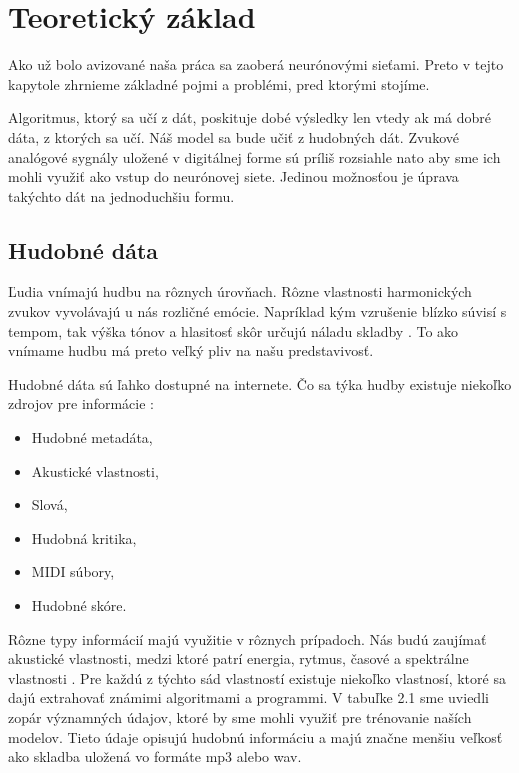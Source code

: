 \chapter{Teoretický základ}
\label{teoreticky_zaklad}

Ako už bolo avizované naša práca sa zaoberá neurónovými sieťami. Preto v tejto kapytole zhrnieme základné pojmi a problémi, pred ktorými stojíme.

Algoritmus, ktorý sa učí z dát, poskituje dobé výsledky len vtedy ak má dobré dáta, z ktorých sa učí. 
Náš model sa bude učiť z hudobných dát.
Zvukové analógové sygnály uložené v digitálnej forme sú príliš rozsiahle nato aby sme ich mohli využiť ako vstup do neurónovej siete.
Jedinou možnosťou je úprava takýchto dát na jednoduchšiu formu.

\section{Hudobné dáta}
Ľudia vnímajú hudbu na rôznych úrovňach.
Rôzne vlastnosti harmonických zvukov vyvolávajú u nás rozličné emócie.
Napríklad kým vzrušenie blízko súvisí s tempom, tak výška tónov a hlasitosť skôr určujú náladu skladby \cite{emotionExtraction}.
To ako vnímame hudbu má preto veľký pliv na našu predstavivosť.

Hudobné dáta sú ľahko dostupné na internete. Čo sa týka hudby existuje niekoľko zdrojov pre informácie \cite{musicMining}:
\begin{itemize}
	\item Hudobné metadáta,
	\item Akustické vlastnosti,
	\item Slová,
	\item Hudobná kritika,
	\item MIDI súbory,
	\item Hudobné skóre.
\end{itemize}
Rôzne typy informácií majú využitie v rôznych prípadoch.
Nás budú zaujímať akustické vlastnosti, medzi ktoré patrí energia, rytmus, časové a spektrálne vlastnosti \cite{emotionExtraction}.
Pre každú z týchto sád vlastností existuje niekoľko vlastnosí, ktoré sa dajú extrahovať známimi algoritmami a programmi.
V tabuľke 2.1 sme uviedli zopár významných údajov, ktoré by sme mohli využiť pre trénovanie naších modelov.
Tieto údaje opisujú hudobnú informáciu a majú značne menšiu veľkosť ako skladba uložená vo formáte mp3 alebo wav.

